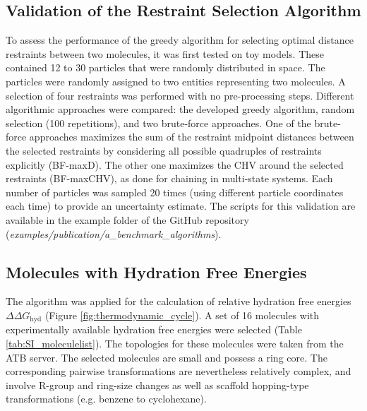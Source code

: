 
\subsection{Validation of the Restraint Selection Algorithm}
To assess the performance of the greedy algorithm for selecting optimal distance restraints between two molecules, it was first tested on toy models. These contained 12 to 30 particles that were randomly distributed in space. The particles were randomly assigned to two entities representing two molecules. A selection of four restraints was performed with no pre-processing steps. Different algorithmic approaches were compared: the developed greedy algorithm, random selection (100 repetitions), and two brute-force approaches. One of the brute-force approaches maximizes the sum of the restraint midpoint distances between the selected restraints by considering all possible quadruples of restraints explicitly (BF-maxD). The other one maximizes the CHV around the selected restraints (BF-maxCHV), as done for chaining in multi-state systems. Each number of particles was sampled 20 times (using different particle coordinates each time) to provide an uncertainty estimate. The scripts for this validation are available in the example folder of the GitHub repository (\textit{examples/publication/a\_benchmark\_algorithms}).

\subsection{Molecules with Hydration Free Energies}
The algorithm was applied for the calculation of relative hydration free energies $\Delta \Delta G_{\text{hyd}}$ (Figure \ref{fig:thermodynamic_cycle}).
A set of 16 molecules with experimentally available hydration free energies\cite{Wolfenden1987,Rizzo2006,Nicholls2008,Guthrie2009,Guthrie2014,Mobley2014} were selected (Table \ref{tab:SI_moleculelist}). 
The topologies for these molecules were taken from the ATB server.\cite{Stroet2018} The selected molecules are small and possess a ring core. The corresponding pairwise transformations are nevertheless relatively complex, and involve R-group and ring-size changes as well as scaffold hopping-type transformations (e.g. benzene to cyclohexane).

